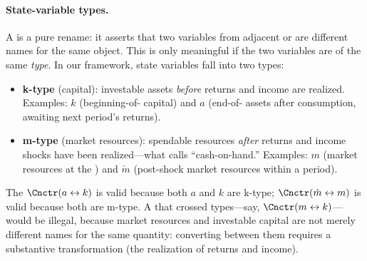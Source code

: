 \documentclass[titlepage, headings=optiontotocandhead]{econark}
\begin{document}
\hypertarget{state-variable-types}{}
\paragraph{State-variable types.}  A {\Cnct} is a pure rename: it asserts that two variables from adjacent {\stgs} or {\intervals} are different names for the same object.  This is only meaningful if the two variables are of the same \textit{type}.  In our framework, state variables fall into two types:
\begin{itemize}
\item \textbf{k-type} (capital): investable assets \textit{before} returns and income are realized.  Examples: $k$ (beginning-of-{\interval} capital) and $a$ (end-of-{\interval} assets after consumption, awaiting next period's returns).
\item \textbf{m-type} (market resources): spendable resources \textit{after} returns and income shocks have been realized---what \citet{deatonUnderstandingC} calls ``cash-on-hand.''  Examples: $m$ (market resources at the {\Decision} {\prch}) and $\check{m}$ (post-shock market resources within a period).
\end{itemize}
\noindent The {\Cnct} $\Cnctr(a \leftrightarrow k)$ is valid because both $a$ and $k$ are k-type; $\Cnctr(\check{m} \leftrightarrow m)$ is valid because both are m-type.  A {\Cnct} that crossed types---say, $\Cnctr(m \leftrightarrow k)$---would be illegal, because market resources and investable capital are not merely different names for the same quantity: converting between them requires a substantive transformation (the realization of returns and income).

  



\end{document}
